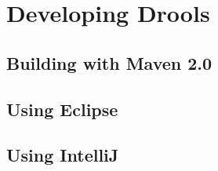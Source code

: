 \chapter{Developing Drools}

\section{Building with Maven 2.0}

\section{Using Eclipse}

\section{Using IntelliJ}

